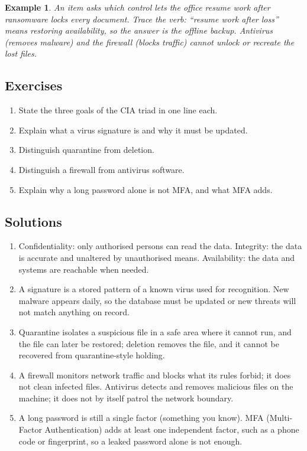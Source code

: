 \documentclass[11pt]{article}
\newtheorem{example}{Example}[section]
\begin{document}
\begin{example}
An item asks which control lets the office resume work after ransomware locks
every document. Trace the verb: ``resume work after loss'' means restoring
availability, so the answer is the offline backup. Antivirus (removes malware)
and the firewall (blocks traffic) cannot unlock or recreate the lost files.
\end{example}

\subsection*{Exercises}
\begin{enumerate}[label=\arabic*.]
  \item State the three goals of the CIA triad in one line each.
  \item Explain what a virus signature is and why it must be updated.
  \item Distinguish quarantine from deletion.
  \item Distinguish a firewall from antivirus software.
  \item Explain why a long password alone is not MFA, and what MFA adds.
\end{enumerate}

\subsection*{Solutions}
\begingroup\small
\begin{enumerate}[label=\arabic*.]
  \item Confidentiality: only authorised persons can read the data.
    Integrity: the data is accurate and unaltered by unauthorised means.
    Availability: the data and systems are reachable when needed.
  \item A signature is a stored pattern of a known virus used for recognition.
    New malware appears daily, so the database must be updated or new threats
    will not match anything on record.
  \item Quarantine isolates a suspicious file in a safe area where it cannot
    run, and the file can later be restored; deletion removes the file, and
    it cannot be recovered from quarantine-style holding.
  \item A firewall monitors network traffic and blocks what its rules forbid;
    it does not clean infected files. Antivirus detects and removes malicious
    files on the machine; it does not by itself patrol the network boundary.
  \item A long password is still a single factor (something you know). MFA
    (Multi-Factor Authentication) adds at least one independent factor, such
    as a phone code or fingerprint, so a leaked password alone is not enough.
\end{enumerate}
\endgroup
\end{document}
